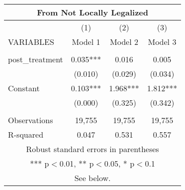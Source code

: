 \begin{tabular}{lccc}
\multicolumn{4}{c}{From Not Locally Legalized} \\ \hline
 & (1) & (2) & (3) \\
VARIABLES & Model 1 & Model 2 & Model 3 \\ \hline
 &  &  &  \\
post\_treatment & 0.035*** & 0.016 & 0.005 \\
 & (0.010) & (0.029) & (0.034) \\
Constant & 0.103*** & 1.968*** & 1.812*** \\
 & (0.000) & (0.325) & (0.342) \\
 &  &  &  \\
Observations & 19,755 & 19,755 & 19,755 \\
 R-squared & 0.047 & 0.531 & 0.557 \\ \hline
\multicolumn{4}{c}{ Robust standard errors in parentheses} \\
\multicolumn{4}{c}{ *** p$<$0.01, ** p$<$0.05, * p$<$0.1} \\
\multicolumn{4}{c}{ See below.} \\
\end{tabular}
